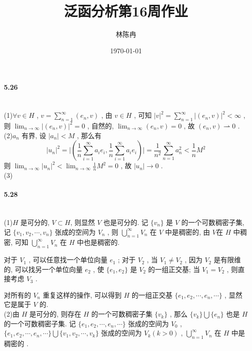\documentclass[UTF8]{ctexart}
\title{泛函分析第16周作业}
\author{林陈冉}
\date{\today}
\begin{document}
\maketitle
    \paragraph{5.26}\quad\\
        \noindent(1)\quad $\forall v \in H$ , 
        $v=\sum^{\infty}_{n=1}(e_n,v)$ , 
        由 $v \in H$ , 
        可知 $\vert v\vert^2=\sum^{\infty}_{n=1}\vert (e_n,v)\vert^2 < \infty$ , 
        则 $\lim_{n\rightarrow\infty}\vert (e_n,v)\vert^2 = 0$ , 
        自然的, $\lim_{n\rightarrow\infty}(e_n,v) = 0$ , 
        故 $(e_n,v)\rightharpoonup 0$ .\\

        \noindent(2)\quad ${a_n}$ 有界, 
        设 $\vert a_n\vert < M$ , 那么有
        \[\vert u_n\vert^2 = \vert (\frac{1}{n}\sum^{\infty}_{i=1}a_ie_i,\frac{1}{n}\sum^{\infty}_{i=1}a_ie_i)\vert = \frac{1}{n^2}\sum^{\infty}_{n=1}a_n^2 < \frac{1}{n}M^2\]
        则 $\lim_{n \rightarrow \infty}\vert u_n\vert^2 < \lim_{n \rightarrow \infty}\frac{1}{n}M^2 = 0$ ,
        故 $\vert u_n\vert \rightarrow 0$ .\\
        
        \noindent(3)\quad\\

    \paragraph{5.28}\quad\\
        \noindent(1)\quad$H$ 是可分的, $V \subset H$, 则显然 $V$ 也是可分的.
        记 $\{v_n\}$ 是 $V$ 的一个可数稠密子集, 
        记 $\{v_1, v_2, \cdots, v_n\}$ 张成的空间为 $V_n$ , 则 $\bigcup^\infty_{n=1}V_n$ 在 $V$ 中是稠密的, 由 $V$在 $H$ 中稠密, 可知 $\bigcup^\infty_{n=1}V_n$ 在 $H$ 中也是稠密的.

        对于 $V_1$ , 可以任意找一个单位向量 $e_1$ ; 
        对于 $V_2$ , 当 $V_1\neq V_2$ , 
        因为 $V_2$ 是有限维的, 可以找另一个单位向量 $e_2$ , 
        使 $\{e_1, e_2\}$ 是 $V_2$ 的一组正交基;
        当 $V_1= V_2$ , 则直接考虑 $V_3$ .

        对所有的 $V_n$ 重复这样的操作, 可以得到 $H$ 的一组正交基 $\{e_1, e_2, \cdots, e_n, \cdots \}$ , 显然它是属于 $V$ 的.\\

        \noindent(2)\quad 由 $H$ 是可分的, 则存在 $H$ 的一个可数稠密子集 $\{v_k\}$ ,
        那么  $\{v_k\}\bigcup\{e_n\}$ 也是 $H$ 的一个可数稠密子集.
        记 $\{e_1, e_2, \cdots, e_n, \cdots \}$ 张成的空间为 $V_0$ , 
        $\{e_1, e_2, \cdots, e_n, \cdots \}\bigcup\{v_1, v_2, \cdots, v_k\}$ 张成的空间为 $V_k(k>0)$ , $\bigcup^\infty_{n=1}V_n$ 在 $H$ 中是稠密的 .
\end{document}
